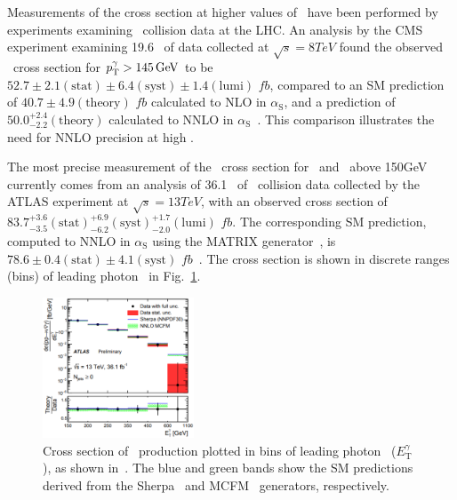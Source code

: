 \documentclass[oneside, letterpaper, 12pt, oldfontcommands]{memoir}
\begin{document}
Measurements of the cross section at higher values of \pTgamma\ have been performed by experiments examining \Pp\Pp\ collision data at the LHC.
An analysis by the CMS experiment examining 19.6 \fbinv\ of data collected at $\sqrt{s} = 8\unit{TeV}$ found the observed \zinvg\ cross section for $\pTgamma > 145\unit{GeV}$ to be
$52.7 \pm 2.1\mathrm{(stat)} \pm 6.4\mathrm{(syst)} \pm 1.4\mathrm{(lumi)}$ $fb$, compared to an SM prediction of $40.7 \pm 4.9\mathrm{(theory)}$ $fb$ calculated to NLO in $\alpha_\mathrm{S}$, and
a prediction of $50.0^{+2.4}_{-2.2}\mathrm{(theory)}$ calculated to NNLO in $\alpha_\mathrm{S}$~\cite{ref:j.physletb.2016.06.080}. This comparison illustrates the need for NNLO precision at high \pTgamma.

The most precise measurement of the \zinvg\ cross section for \pTgamma\ and \MET\ above 150\unit{GeV} currently comes from an analysis of 36.1 \fbinv\ of \Pp\Pp\ collision data
collected by the ATLAS experiment at $\sqrt{s} = 13\unit{TeV}$, with an observed cross section of $83.7^{+3.6}_{-3.5}\mathrm{(stat)}^{+6.9}_{-6.2}\mathrm{(syst)}^{+1.7}_{-2.0}\mathrm{(lumi)}$ $fb$.
The corresponding SM prediction, computed to NNLO in $\alpha_\mathrm{S}$ using the MATRIX generator~\cite{ref:epjc/s10052-018-5771-7}, is $78.6 \pm 0.4\mathrm{(stat)} \pm 4.1\mathrm{(syst)}$ $fb$~\cite{ref:CERN-EP-2018-220}.
The cross section is shown in discrete ranges (bins) of leading photon \pT\ in Fig.~\ref{fig:znng_xsec_phoET_ATLAS}.

\begin{figure}[hbtp]
  \begin{center}
    \includegraphics[width=0.4\textwidth]{Figures/znng_xsec_phoET_ATLAS.png}
    \caption{
      Cross section of \zinvg\ production plotted in bins of leading photon \pT\ ($E^{\gamma}_\mathrm{T}$), as shown in~\cite{ref:CERN-EP-2018-220}.
      The blue and green bands show the SM predictions derived from the Sherpa~\cite{ref:1126-6708/2009/02/007} and MCFM~\cite{ref:JHEP07(2011)018} generators, respectively.
    }
    \label{fig:znng_xsec_phoET_ATLAS}
  \end{center}
\end{figure}
\end{document}
